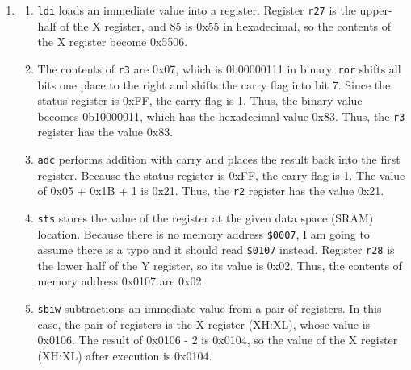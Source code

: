 \documentclass[11pt]{article}
\begin{document}
\begin{enumerate}[leftmargin=0.2in]
\item
  \begin{enumerate}[label=(\roman*)]
  \item \texttt{ldi} loads an immediate value into a register. Register \texttt{r27} is the upper-half of the X register, and 85 is 0x55 in hexadecimal, so the contents of the X register become 0x5506.

  \item The contents of \texttt{r3} are 0x07, which is 0b00000111 in binary. \texttt{ror} shifts all bits one place to the right and shifts the carry flag into bit 7. Since the status register is 0xFF, the carry flag is 1. Thus, the binary value becomes 0b10000011, which has the hexadecimal value 0x83. Thus, the \texttt{r3} register has the value 0x83.

  \item \texttt{adc} performs addition with carry and places the result back into the first register. Because the status register is 0xFF, the carry flag is 1. The value of 0x05 + 0x1B + 1 is 0x21. Thus, the \texttt{r2} register has the value 0x21.

  \item \texttt{sts} stores the value of the register at the given data space (SRAM) location. Because there is no memory address \texttt{\$0007}, I am going to assume there is a typo and it should read \texttt{\$0107} instead. Register \texttt{r28} is the lower half of the Y register, so its value is 0x02. Thus, the contents of memory address 0x0107 are 0x02.

  \item \texttt{sbiw} subtractions an immediate value from a pair of registers. In this case, the pair of registers is the X register (XH:XL), whose value is 0x0106. The result of 0x0106 - 2 is 0x0104, so the value of the X register (XH:XL) after execution is 0x0104.
\end{enumerate}

\end{enumerate}
\end{document}
